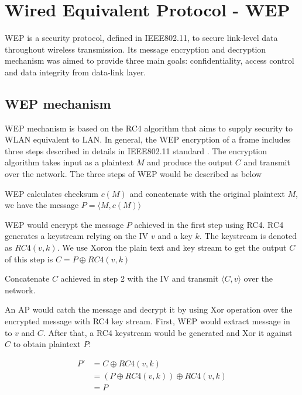 \section{Wired Equivalent Protocol - WEP}\label{section:wep}


\ac{WEP} is a security protocol, defined in \ac{IEEE}802.11, to secure link-level data throughout wireless transmission. Its message encryption and decryption mechanism was aimed to provide three main goals: confidentiality, access control and data integrity from data-link layer.
\subsection{WEP mechanism}\label{subsec:wep_mec}
\ac{WEP} mechanism is based on the \ac{RC4} algorithm\cite{mousa2006evaluation} that aims to supply security to \ac{WLAN} equivalent to \ac{LAN}. In general, the \ac{WEP} encryption of a frame includes three steps described in details in \ac{IEEE}802.11 standard \cite{al2006ieee}. The encryption algorithm takes input as a plaintext $M$ and produce the output $C$ and transmit over the network. The three steps of \ac{WEP} would be described as below
\begin{steps}
	\item \ac{WEP} calculates checksum $c(M)$ and concatenate with the original plaintext $M$, we have the message $P = \langle M, c(M) \rangle $
	\item \ac{WEP} would encrypt the message $P$ achieved in the first step using \ac{RC4}. \ac{RC4} generates a keystream relying on the \ac{IV} $v$ and a key $k$. The keystream is denoted as $RC4(v,k)$. We use \ac{Xor}on the plain text and key stream to get the output $C$ of this step is $C = P \oplus RC4(v,k)$
	\item Concatenate $C$ achieved in step 2 with the \ac{IV} and transmit $\langle C, v \rangle $ over the network.
\end{steps}

An \ac{AP} would catch the message and decrypt it by using \ac{Xor} operation over the encrypted message with \ac{RC4} key stream.  First, \ac{WEP} would extract message in to $v$ and $C$. After that, a \ac{RC4} keystream would be generated and \ac{Xor} it against $C$ to obtain plaintext $P$:
\begin{center}
	\begin{align}
	P'&= C \oplus RC4(v, k) \\
	&= (P \oplus RC4(v, k)) \oplus RC4(v, k) \\
	&= P
	\end{align}
\end{center}

